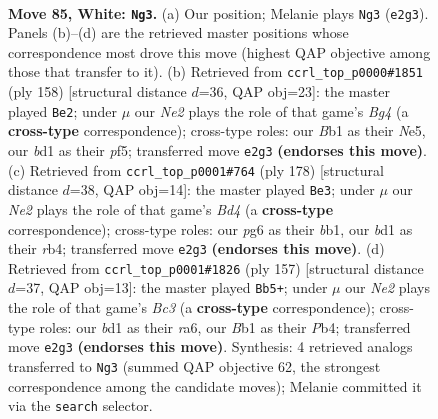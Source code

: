 \documentclass[11pt]{article}
\begin{document}
\clearpage

\begin{figure}[p]\centering
\begin{subfigure}{0.46\textwidth}\centering
\resizebox{\linewidth}{!}{%
\newchessgame
\chessboard[
  setfen={5r2/5p2/n5p1/4P2p/2k2Pp1/8/4N2P/1B1b2K1 w - - 28 85},
  showmover=false,
  pgfstyle=straightmove, color=movearrow, markmove={e2-g3}
]}
\caption{}
\end{subfigure}\hfill
\begin{subfigure}{0.46\textwidth}\centering
\resizebox{\linewidth}{!}{%
\newchessgame
\chessboard[
  setfen={7r/4k3/4p1P1/3pNp2/3P2B1/4P3/6K1/8 w - - 0 80},
  showmover=false,
  pgfstyle=straightmove, color=movearrow, markmove={g4-e2}
]}
\caption{}
\end{subfigure}
\\[4pt]
\begin{subfigure}{0.46\textwidth}\centering
\resizebox{\linewidth}{!}{%
\newchessgame
\chessboard[
  setfen={7k/6p1/5p1p/3B3P/1r1B1NP1/5P2/7K/1b6 w - - 5 90},
  showmover=false,
  pgfstyle=straightmove, color=movearrow, markmove={d4-e3}
]}
\caption{}
\end{subfigure}\hfill
\begin{subfigure}{0.46\textwidth}\centering
\resizebox{\linewidth}{!}{%
\newchessgame
\chessboard[
  setfen={8/8/R1b2P2/2k1P1p1/1p4P1/1Pp3r1/2P1K3/1B6 b - - 2 79},
  showmover=false,
  pgfstyle=straightmove, color=movearrow, markmove={c6-b5}
]}
\caption{}
\end{subfigure}
\caption{\textbf{Move 85, White: \texttt{Ng3}.} (a) Our position; Melanie plays \texttt{Ng3} (\texttt{e2g3}). Panels (b)--(d) are the retrieved master positions whose correspondence most drove this move (highest QAP objective among those that transfer to it). (b) Retrieved from \texttt{ccrl\_top\_p0000\#1851} (ply 158) [structural distance $d$=36, QAP obj=23]: the master played \texttt{Be2}; under $\mu$ our \emph{Ne2} plays the role of that game's \emph{Bg4} (a \textbf{cross-type} correspondence); cross-type roles: our \emph{B}b1 as their \emph{N}e5, our \emph{b}d1 as their \emph{p}f5; transferred move \texttt{e2g3} \textbf{(endorses this move)}. (c) Retrieved from \texttt{ccrl\_top\_p0001\#764} (ply 178) [structural distance $d$=38, QAP obj=14]: the master played \texttt{Be3}; under $\mu$ our \emph{Ne2} plays the role of that game's \emph{Bd4} (a \textbf{cross-type} correspondence); cross-type roles: our \emph{p}g6 as their \emph{b}b1, our \emph{b}d1 as their \emph{r}b4; transferred move \texttt{e2g3} \textbf{(endorses this move)}. (d) Retrieved from \texttt{ccrl\_top\_p0001\#1826} (ply 157) [structural distance $d$=37, QAP obj=13]: the master played \texttt{Bb5+}; under $\mu$ our \emph{Ne2} plays the role of that game's \emph{Bc3} (a \textbf{cross-type} correspondence); cross-type roles: our \emph{b}d1 as their \emph{r}a6, our \emph{B}b1 as their \emph{P}b4; transferred move \texttt{e2g3} \textbf{(endorses this move)}. Synthesis: 4 retrieved analogs transferred to \texttt{Ng3} (summed QAP objective 62, the strongest correspondence among the candidate moves); Melanie committed it via the \texttt{search} selector.}
\label{fig:thought-m168}
\end{figure}
\end{document}
